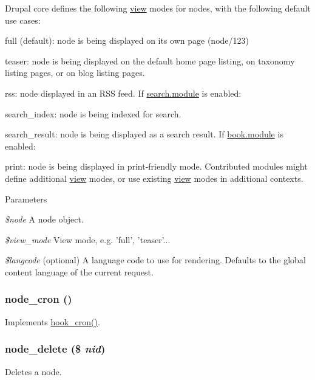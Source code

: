 Drupal core defines the following \hyperlink{classview}{view} modes for nodes, with the following default use cases:
\begin{DoxyItemize}
\item full (default): node is being displayed on its own page (node/123)
\item teaser: node is being displayed on the default home page listing, on taxonomy listing pages, or on blog listing pages.
\item rss: node displayed in an RSS feed. If \hyperlink{search_8module}{search.module} is enabled:
\item search\_\-index: node is being indexed for search.
\item search\_\-result: node is being displayed as a search result. If \hyperlink{book_8module}{book.module} is enabled:
\item print: node is being displayed in print-\/friendly mode. Contributed modules might define additional \hyperlink{classview}{view} modes, or use existing \hyperlink{classview}{view} modes in additional contexts.
\end{DoxyItemize}


\begin{DoxyParams}{Parameters}
\item[{\em \$node}]A node object. \item[{\em \$view\_\-mode}]View mode, e.g. 'full', 'teaser'... \item[{\em \$langcode}](optional) A language code to use for rendering. Defaults to the global content language of the current request. \end{DoxyParams}
\hypertarget{node_8module_a73900233bedb93afcf66aee69d05c026}{
\subsubsection[{node\_\-cron}]{\setlength{\rightskip}{0pt plus 5cm}node\_\-cron ()}}
\label{node_8module_a73900233bedb93afcf66aee69d05c026}
Implements \hyperlink{group__hooks_gaf07f1e3d98112fc2ba6920cf7ee6fb16}{hook\_\-cron()}. \hypertarget{node_8module_a707438913046b4959fa531386beb8024}{
\subsubsection[{node\_\-delete}]{\setlength{\rightskip}{0pt plus 5cm}node\_\-delete (\$ {\em nid})}}
\label{node_8module_a707438913046b4959fa531386beb8024}
Deletes a node.


